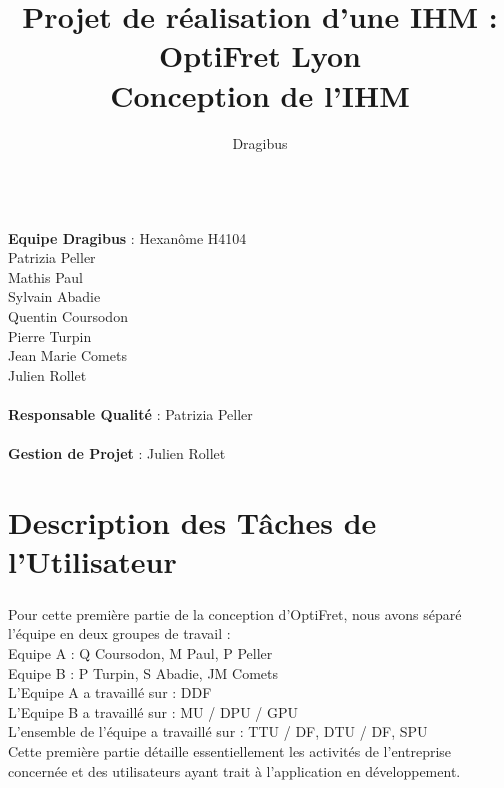 \documentclass{report}
\begin{document}
\title {Projet de réalisation d'une IHM : OptiFret Lyon \\ Conception de l'IHM}
\author{Dragibus}
\maketitle


\newpage
~~\\
\textbf{Equipe Dragibus} : Hexanôme H4104 \\
Patrizia Peller\\
Mathis Paul\\
Sylvain Abadie\\
Quentin Coursodon\\
Pierre Turpin\\
Jean Marie Comets\\
Julien Rollet\\

~~\\
\textbf{Responsable Qualité} : Patrizia Peller\\
~~\\
\textbf{Gestion de Projet} : Julien Rollet\\


\tableofcontents



\chapter{Description des Tâches de l'Utilisateur}

\paragraph{}
Pour cette première partie de la conception d'OptiFret, nous avons séparé l'équipe en deux groupes de travail :\\
Equipe A : Q Coursodon, M Paul, P Peller \\
Equipe B : P Turpin, S Abadie, JM Comets\\

L'Equipe A a travaillé sur : DDF \\

L'Equipe B a travaillé sur : MU / DPU / GPU \\

L’ensemble de l’équipe a travaillé sur : TTU / DF, DTU / DF, SPU \\


Cette première partie détaille essentiellement les activités de l'entreprise concernée et des utilisateurs ayant trait à l'application en développement.
\end{document}
